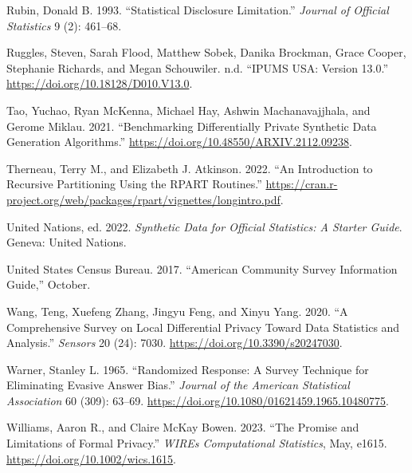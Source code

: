 \documentclass[
]{urban-formatting}
\newlength{\cslhangindent}
\newlength{\cslentryspacingunit} %
\newenvironment{CSLReferences}[2] %
 {%
  \setlength{\parindent}{0pt}
  \ifodd #1
  \let\oldpar\par
  \def\par{\hangindent=\cslhangindent\oldpar}
  \fi
  \setlength{\parskip}{#2\cslentryspacingunit}
 }%
 {}
\begin{document}
\begin{CSLReferences}{1}{0}
\leavevmode{}%
Rubin, Donald B. 1993. {``Statistical Disclosure Limitation.''}
\emph{Journal of Official Statistics} 9 (2): 461--68.

\leavevmode{}%
Ruggles, Steven, Sarah Flood, Matthew Sobek, Danika Brockman, Grace
Cooper, Stephanie Richards, and Megan Schouwiler. n.d. {``IPUMS USA:
Version 13.0.''} \url{https://doi.org/10.18128/D010.V13.0}.

\leavevmode{}%
Tao, Yuchao, Ryan McKenna, Michael Hay, Ashwin Machanavajjhala, and
Gerome Miklau. 2021. {``Benchmarking Differentially Private Synthetic
Data Generation Algorithms.''}
\url{https://doi.org/10.48550/ARXIV.2112.09238}.

\leavevmode{}%
Therneau, Terry M., and Elizabeth J. Atkinson. 2022. {``An Introduction
to Recursive Partitioning Using the RPART Routines.''}
\url{https://cran.r-project.org/web/packages/rpart/vignettes/longintro.pdf}.

\leavevmode{}%
United Nations, ed. 2022. \emph{Synthetic Data for Official Statistics:
A Starter Guide}. Geneva: United Nations.

\leavevmode{}%
United States Census Bureau. 2017. {``American Community Survey
Information Guide,''} October.

\leavevmode{}%
Wang, Teng, Xuefeng Zhang, Jingyu Feng, and Xinyu Yang. 2020. {``A
Comprehensive Survey on Local Differential Privacy Toward Data
Statistics and Analysis.''} \emph{Sensors} 20 (24): 7030.
\url{https://doi.org/10.3390/s20247030}.

\leavevmode{}%
Warner, Stanley L. 1965. {``Randomized Response: A Survey Technique for
Eliminating Evasive Answer Bias.''} \emph{Journal of the American
Statistical Association} 60 (309): 63--69.
\url{https://doi.org/10.1080/01621459.1965.10480775}.

\leavevmode{}%
Williams, Aaron R., and Claire McKay Bowen. 2023. {``The Promise and
Limitations of Formal Privacy.''} \emph{WIREs Computational Statistics},
May, e1615. \url{https://doi.org/10.1002/wics.1615}.

\end{CSLReferences}
\end{document}
